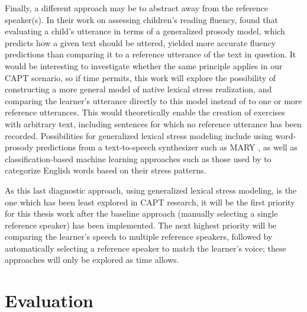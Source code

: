 	Finally, a different approach may be to abstract away from the reference speaker(s). In their work on assessing children's reading fluency, \textcite{Duong2011} found that evaluating a child's utterance in terms of a generalized prosody model, which predicts how a given text should be uttered, yielded more accurate fluency predictions than comparing it to a reference utterance of the text in question. It would be interesting to investigate whether the same principle applies in our CAPT scenario, so if time permits, this work will explore the possibility of constructing a more general model of native lexical stress realization, and comparing the learner's utterance directly to this model instead of to one or more reference utterances. 
This would 
theoretically enable the creation of exercises with arbitrary text, including sentences for which no reference utterance has been recorded. 
%
Possibilities for generalized lexical stress modeling include using word-prosody predictions from a text-to-speech synthesizer such as MARY \citep{Schroeder2003}, as well as
classification-based machine learning approaches such as those used by \textcite{Shahin2012a,Kim2011} to categorize English words based on their stress patterns.
%

As this last diagnostic approach, using generalized lexical stress modeling, is the one which has been least explored in CAPT research, it will be the first priority for this thesis work after the baseline approach (manually selecting a single reference speaker) has been implemented. The next highest priority will be comparing the learner's speech to multiple reference speakers, followed by automatically selecting a reference speaker to match the learner's voice; these approaches will only be explored as time allows.

\section{Evaluation}
\label{sec:diag:eval}

